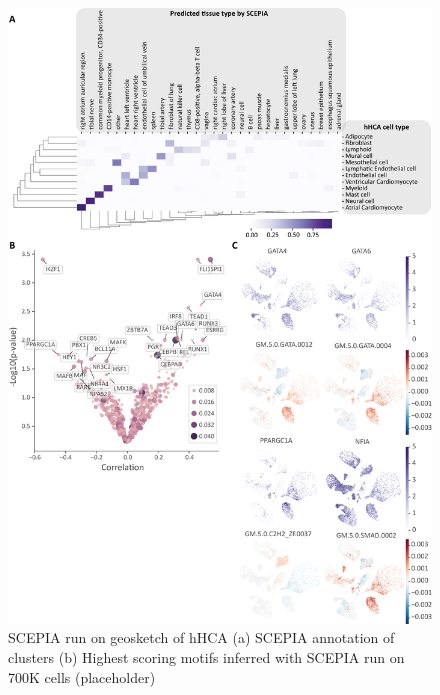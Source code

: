 \begin{figure}
    \centering
    \includegraphics[width=\linewidth]{SCEPIAGEOSKETCH_AllCells20000_Suppfig.png}
    \caption{SCEPIA run on geosketch of hHCA (a) SCEPIA annotation of clusters (b) Highest scoring motifs inferred with SCEPIA run on 700K cells (placeholder) }
    \label{fig:scepia_hhca1}
\end{figure}